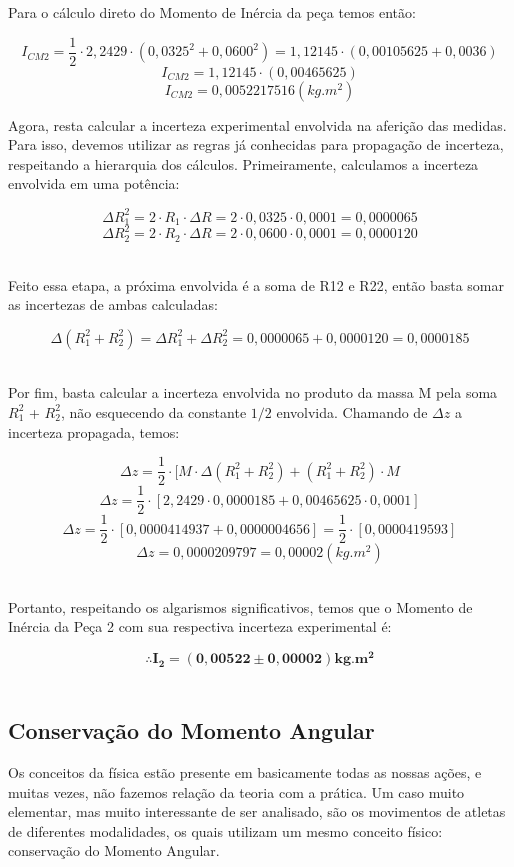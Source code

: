 Para o cálculo direto do Momento de Inércia da peça temos então:

\[I_{CM2} = \frac{1}{2} \cdot 2,2429 \cdot (0,0325^2+0,0600^2) = 1,12145 \cdot (0,00105625 + 0,0036)\]
\[I_{CM2} = 1,12145 \cdot (0,00465625)\]
\[I_{CM2} = 0,0052217516 (kg.m^2)\]

Agora, resta calcular a incerteza experimental envolvida na aferição das medidas. Para isso, devemos utilizar as regras já conhecidas para propagação de incerteza, respeitando a hierarquia dos cálculos. Primeiramente, calculamos a incerteza envolvida em uma potência:

\[\Delta R_1^2 = 2 \cdot R_1 \cdot \Delta R = 2 \cdot 0,0325 \cdot 0,0001 = 0,0000065\]
\[\Delta R_2^2 = 2 \cdot R_2 \cdot \Delta R = 2 \cdot 0,0600 \cdot 0,0001 = 0,0000120\]\

Feito essa etapa, a próxima envolvida é a soma de R12 e R22, então basta somar as incertezas de ambas calculadas:

\[\Delta (R_1^2 + R_2^2) = \Delta R_1^2 + \Delta R_2^2 = 0,0000065 + 0,0000120 = 0,0000185\]\

Por fim, basta calcular a incerteza envolvida no produto da massa M pela soma $R_1^2$ + $R_2^2$, não esquecendo da constante $1/2$ envolvida. Chamando de $\Delta z$ a incerteza propagada, temos:

\[\Delta z = \frac {1}{2}\cdot[M\cdot \Delta(R_1^2 + R_2^2) + (R_1^2 + R_2^2)\cdot M\]
\[\Delta z = \frac {1}{2}\cdot[2,2429\cdot 0,0000185 + 0,00465625\cdot 0,0001]\]
\[\Delta z = \frac {1}{2}\cdot[0,0000414937 + 0,0000004656] =\frac {1}{2}\cdot[0,0000419593] \]
\[\Delta z = 0,0000209797 = 0,00002 (kg.m^2)\]\

Portanto, respeitando os algarismos significativos, temos que o Momento de Inércia da Peça 2 com sua respectiva incerteza experimental é:

\[\therefore \mathbf{I_2 = (0,00522 \pm 0,00002) kg.m^2}\]\



\subsection{Conservação do Momento Angular}

Os conceitos da física estão presente em basicamente todas as nossas ações, e muitas vezes, não fazemos relação da teoria com a prática. Um caso muito elementar, mas muito interessante de ser analisado, são os movimentos de atletas de diferentes modalidades, os quais utilizam um mesmo conceito físico:  conservação do Momento Angular.


